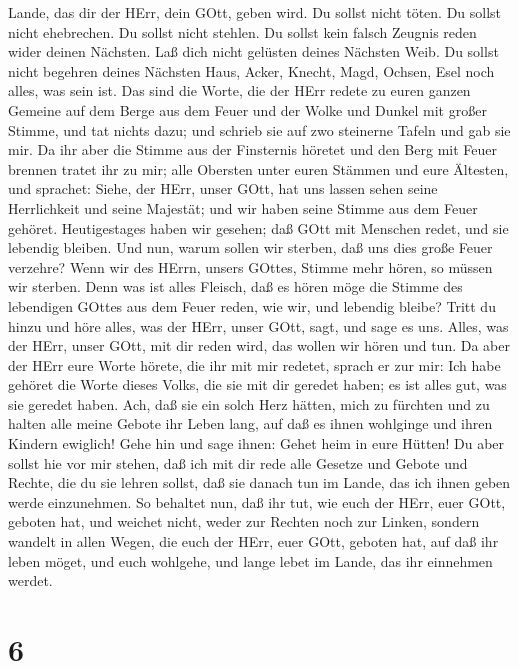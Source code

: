 Lande, das dir der HErr, dein GOtt, geben wird.  Du sollst
nicht töten.  Du sollst nicht ehebrechen.  Du
sollst nicht stehlen.  Du sollst kein falsch Zeugnis reden
wider deinen Nächsten.  Laß dich nicht gelüsten deines
Nächsten Weib. Du sollst nicht begehren deines Nächsten Haus, Acker,
Knecht, Magd, Ochsen, Esel noch alles, was sein ist.  Das
sind die Worte, die der HErr redete zu euren ganzen Gemeine auf dem
Berge aus dem Feuer und der Wolke und Dunkel mit großer Stimme, und tat
nichts dazu; und schrieb sie auf zwo steinerne Tafeln und gab sie mir.
 Da ihr aber die Stimme aus der Finsternis höretet und den
Berg mit Feuer brennen tratet ihr zu mir; alle Obersten unter euren
Stämmen und eure Ältesten,  und sprachet: Siehe, der HErr,
unser GOtt, hat uns lassen sehen seine Herrlichkeit und seine Majestät;
und wir haben seine Stimme aus dem Feuer gehöret. Heutigestages haben
wir gesehen; daß GOtt mit Menschen redet, und sie lebendig bleiben.
 Und nun, warum sollen wir sterben, daß uns dies große
Feuer verzehre? Wenn wir des HErrn, unsers GOttes, Stimme mehr hören, so
müssen wir sterben.  Denn was ist alles Fleisch, daß es
hören möge die Stimme des lebendigen GOttes aus dem Feuer reden, wie
wir, und lebendig bleibe?  Tritt du hinzu und höre alles,
was der HErr, unser GOtt, sagt, und sage es uns. Alles, was der HErr,
unser GOtt, mit dir reden wird, das wollen wir hören und tun.
 Da aber der HErr eure Worte hörete, die ihr mit mir
redetet, sprach er zur mir: Ich habe gehöret die Worte dieses Volks, die
sie mit dir geredet haben; es ist alles gut, was sie geredet haben.
 Ach, daß sie ein solch Herz hätten, mich zu fürchten und
zu halten alle meine Gebote ihr Leben lang, auf daß es ihnen wohlginge
und ihren Kindern ewiglich!  Gehe hin und sage ihnen: Gehet
heim in eure Hütten!  Du aber sollst hie vor mir stehen,
daß ich mit dir rede alle Gesetze und Gebote und Rechte, die du sie
lehren sollst, daß sie danach tun im Lande, das ich ihnen geben werde
einzunehmen.  So behaltet nun, daß ihr tut, wie euch der
HErr, euer GOtt, geboten hat, und weichet nicht, weder zur Rechten noch
zur Linken,  sondern wandelt in allen Wegen, die euch der
HErr, euer GOtt, geboten hat, auf daß ihr leben möget, und euch
wohlgehe, und lange lebet im Lande, das ihr einnehmen werdet.

\hypertarget{section-5}{%
\section{6}\label{section-5}}

